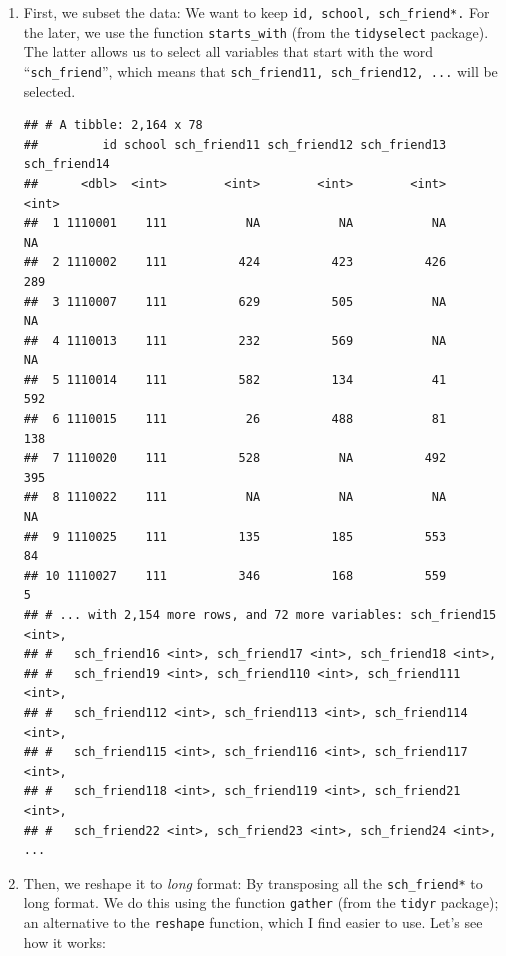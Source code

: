 \documentclass[]{book}
\newenvironment{Shaded}{\begin{snugshade}}{\end{snugshade}}
\newcommand{\KeywordTok}[1]{\textcolor[rgb]{0.13,0.29,0.53}{\textbf{#1}}}
\newcommand{\NormalTok}[1]{#1}
\newcommand{\OperatorTok}[1]{\textcolor[rgb]{0.81,0.36,0.00}{\textbf{#1}}}
\newcommand{\StringTok}[1]{\textcolor[rgb]{0.31,0.60,0.02}{#1}}
\begin{document}
\begin{enumerate}
\def\labelenumi{\arabic{enumi}.}
\item
  First, we subset the data: We want to keep \texttt{id,\ school,\ sch\_friend*.} For the later, we use the function \texttt{starts\_with} (from the \texttt{tidyselect} package). The latter allows us to select all variables that start with the word ``\texttt{sch\_friend}'', which means that \texttt{sch\_friend11,\ sch\_friend12,\ ...} will be selected.

\begin{Shaded}
\end{Shaded}

\begin{verbatim}
## # A tibble: 2,164 x 78
##         id school sch_friend11 sch_friend12 sch_friend13 sch_friend14
##      <dbl>  <int>        <int>        <int>        <int>        <int>
##  1 1110001    111           NA           NA           NA           NA
##  2 1110002    111          424          423          426          289
##  3 1110007    111          629          505           NA           NA
##  4 1110013    111          232          569           NA           NA
##  5 1110014    111          582          134           41          592
##  6 1110015    111           26          488           81          138
##  7 1110020    111          528           NA          492          395
##  8 1110022    111           NA           NA           NA           NA
##  9 1110025    111          135          185          553           84
## 10 1110027    111          346          168          559            5
## # ... with 2,154 more rows, and 72 more variables: sch_friend15 <int>,
## #   sch_friend16 <int>, sch_friend17 <int>, sch_friend18 <int>,
## #   sch_friend19 <int>, sch_friend110 <int>, sch_friend111 <int>,
## #   sch_friend112 <int>, sch_friend113 <int>, sch_friend114 <int>,
## #   sch_friend115 <int>, sch_friend116 <int>, sch_friend117 <int>,
## #   sch_friend118 <int>, sch_friend119 <int>, sch_friend21 <int>,
## #   sch_friend22 <int>, sch_friend23 <int>, sch_friend24 <int>, ...
\end{verbatim}
\item
  Then, we reshape it to \emph{long} format: By transposing all the \texttt{sch\_friend*} to long format. We do this using the function \texttt{gather} (from the \texttt{tidyr} package); an alternative to the \texttt{reshape} function, which I find easier to use. Let's see how it works:


\end{enumerate}
\end{document}
